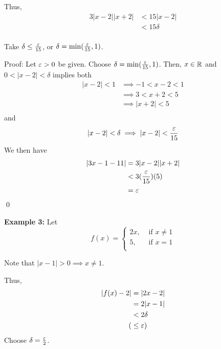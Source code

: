 \documentclass{article}
\begin{document}
\begin{examples}
Thus, \begin{align*}
    3|x-2||x+2| &< 15 |x-2| \tag{Provided $\delta < 1$}\\
    &< 15\delta \tag{We want this expression to be $\leq \ep$}\\
\end{align*}

Take $\delta \leq \frac{\varepsilon}{15}$, or $\delta = \min(\frac{\varepsilon}{15}, 1)$.

Proof:
Let $\varepsilon > 0$ be given. Choose $\delta = \min(\frac{\varepsilon}{15}, 1)$. Then, $x \in \mathbb{R}$ and $0 < |x-2| < \delta$ implies both
\begin{align*}
    |x-2| < 1 &\implies -1 < x-2 < 1\\
    &\implies 3 < x+2 < 5\\
    &\implies |x+2| < 5\\
\end{align*}
and \[
|x-2| < \delta \implies |x-2| < \frac{\varepsilon}{15}
\]
We then have
\begin{align*}
    |3x-1-11| &= 3 \abs{x-2}\abs{x+2}\\
    &< 3(\frac{\varepsilon}{15})(5)\\
    &= \varepsilon\\
\end{align*}
\qed

\textbf{Example 3:}\newline
Let \[
f(x) = \begin{cases}
    2x, &\text{ if } x \not= 1\\
    5, &\text{ if } x=1\\
\end{cases}
\]
\begin{center}
\end{center}

Note that $|x-1| > 0 \implies x \not= 1$.

Thus, \begin{align*}
    |f(x) - 2| &= |2x-2|\\
    &= 2|x-1|\\
    &< 2\delta\\
    (& \leq \varepsilon)\\
\end{align*}
Choose $\delta = \frac{\varepsilon}{2}$.


\end{examples}
\end{document}

